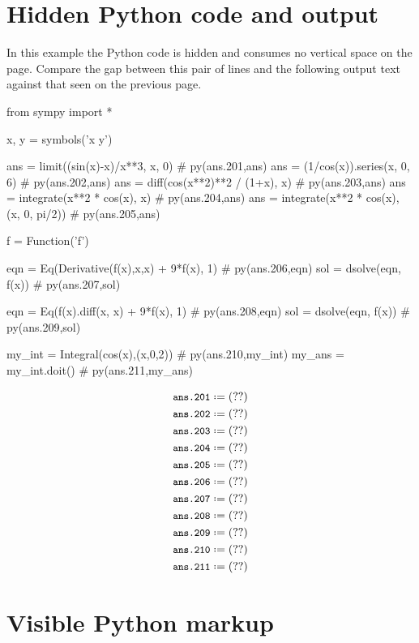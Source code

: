 \documentclass[12pt]{pylatex}
\begin{document}
\clearpage

\section*{Hidden Python code and output}


In this example the Python code is hidden and consumes no vertical space on the page. Compare the gap between this pair of lines and the following output text against that seen on the previous page.
%
\begin{python}
   from sympy import *

   x, y = symbols('x y')

   ans = limit((sin(x)-x)/x**3, x, 0)               # py(ans.201,ans)
   ans = (1/cos(x)).series(x, 0, 6)                 # py(ans.202,ans)
   ans = diff(cos(x**2)**2 / (1+x), x)              # py(ans.203,ans)
   ans = integrate(x**2 * cos(x), x)                # py(ans.204,ans)
   ans = integrate(x**2 * cos(x), (x, 0, pi/2))     # py(ans.205,ans)

   f = Function('f')

   eqn = Eq(Derivative(f(x),x,x) + 9*f(x), 1)       # py(ans.206,eqn)
   sol = dsolve(eqn, f(x))                          # py(ans.207,sol)

   eqn = Eq(f(x).diff(x, x) + 9*f(x), 1)            # py(ans.208,eqn)
   sol = dsolve(eqn, f(x))                          # py(ans.209,sol)

   my_int = Integral(cos(x),(x,0,2))                # py(ans.210,my_int)
   my_ans = my_int.doit()                           # py(ans.211,my_ans)
\end{python}
%
\begin{align*}
   &\py*{ans.201}\\
   &\py*{ans.202}\\
   &\py*{ans.203}\\
   &\py*{ans.204}\\
   &\py*{ans.205}\\
   &\py*{ans.206}\\
   &\py*{ans.207}\\
   &\py*{ans.208}\\
   &\py*{ans.209}\\
   &\py*{ans.210}\\
   &\py*{ans.211}
\end{align*}

\clearpage

\section*{Visible Python markup}
\end{document}
